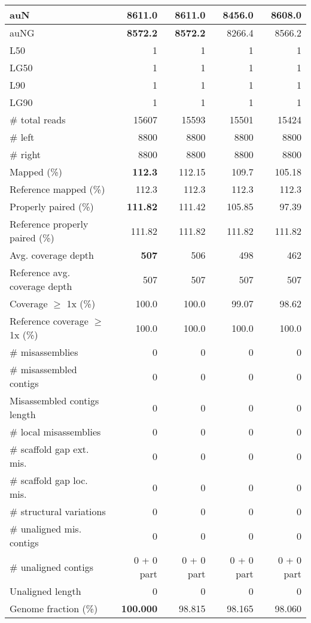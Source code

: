 \documentclass[12pt,a4paper]{article}
\begin{document}
\begin{table}[ht]
\begin{center}
\begin{tabular}{|l*{4}{|r}|}
auN & {\bf 8611.0} & {\bf 8611.0} & 8456.0 & 8608.0 \\ \hline
auNG & {\bf 8572.2} & {\bf 8572.2} & 8266.4 & 8566.2 \\ \hline
L50 & 1 & 1 & 1 & 1 \\ \hline
LG50 & 1 & 1 & 1 & 1 \\ \hline
L90 & 1 & 1 & 1 & 1 \\ \hline
LG90 & 1 & 1 & 1 & 1 \\ \hline
\# total reads & 15607 & 15593 & 15501 & 15424 \\ \hline
\# left & 8800 & 8800 & 8800 & 8800 \\ \hline
\# right & 8800 & 8800 & 8800 & 8800 \\ \hline
Mapped (\%) & {\bf 112.3} & 112.15 & 109.7 & 105.18 \\ \hline
Reference mapped (\%) & 112.3 & 112.3 & 112.3 & 112.3 \\ \hline
Properly paired (\%) & {\bf 111.82} & 111.42 & 105.85 & 97.39 \\ \hline
Reference properly paired (\%) & 111.82 & 111.82 & 111.82 & 111.82 \\ \hline
Avg. coverage depth & {\bf 507} & 506 & 498 & 462 \\ \hline
Reference avg. coverage depth & 507 & 507 & 507 & 507 \\ \hline
Coverage $\geq$ 1x (\%) & 100.0 & 100.0 & 99.07 & 98.62 \\ \hline
Reference coverage $\geq$ 1x (\%) & 100.0 & 100.0 & 100.0 & 100.0 \\ \hline
\# misassemblies & 0 & 0 & 0 & 0 \\ \hline
\# misassembled contigs & 0 & 0 & 0 & 0 \\ \hline
Misassembled contigs length & 0 & 0 & 0 & 0 \\ \hline
\# local misassemblies & 0 & 0 & 0 & 0 \\ \hline
\# scaffold gap ext. mis. & 0 & 0 & 0 & 0 \\ \hline
\# scaffold gap loc. mis. & 0 & 0 & 0 & 0 \\ \hline
\# structural variations & 0 & 0 & 0 & 0 \\ \hline
\# unaligned mis. contigs & 0 & 0 & 0 & 0 \\ \hline
\# unaligned contigs & 0 + 0 part & 0 + 0 part & 0 + 0 part & 0 + 0 part \\ \hline
Unaligned length & 0 & 0 & 0 & 0 \\ \hline
Genome fraction (\%) & {\bf 100.000} & 98.815 & 98.165 & 98.060 \\ \hline

\end{tabular}
\end{center}
\end{table}
\end{document}
